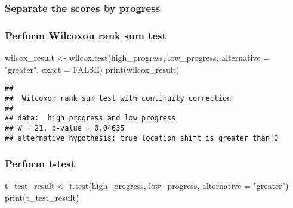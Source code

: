 \documentclass[
]{article}
\newenvironment{Shaded}{\begin{snugshade}}{\end{snugshade}}
\newcommand{\AttributeTok}[1]{\textcolor[rgb]{0.77,0.63,0.00}{#1}}
\newcommand{\ConstantTok}[1]{\textcolor[rgb]{0.00,0.00,0.00}{#1}}
\newcommand{\FunctionTok}[1]{\textcolor[rgb]{0.00,0.00,0.00}{#1}}
\newcommand{\NormalTok}[1]{#1}
\newcommand{\OtherTok}[1]{\textcolor[rgb]{0.56,0.35,0.01}{#1}}
\newcommand{\SpecialCharTok}[1]{\textcolor[rgb]{0.00,0.00,0.00}{#1}}
\newcommand{\StringTok}[1]{\textcolor[rgb]{0.31,0.60,0.02}{#1}}
\begin{document}
\hypertarget{separate-the-scores-by-progress}{%
\subsubsection{Separate the scores by
progress}\label{separate-the-scores-by-progress}}

\begin{Shaded}
\end{Shaded}

\hypertarget{perform-wilcoxon-rank-sum-test}{%
\subsubsection{Perform Wilcoxon rank sum
test}\label{perform-wilcoxon-rank-sum-test}}

\begin{Shaded}
\begin{Highlighting}[]
\NormalTok{wilcox\_result }\OtherTok{\textless{}{-}} \FunctionTok{wilcox.test}\NormalTok{(high\_progress, low\_progress, }\AttributeTok{alternative =} \StringTok{"greater"}\NormalTok{, }\AttributeTok{exact =} \ConstantTok{FALSE}\NormalTok{)}
\FunctionTok{print}\NormalTok{(wilcox\_result)}
\end{Highlighting}
\end{Shaded}

\begin{verbatim}
## 
##  Wilcoxon rank sum test with continuity correction
## 
## data:  high_progress and low_progress
## W = 21, p-value = 0.04635
## alternative hypothesis: true location shift is greater than 0
\end{verbatim}

\hypertarget{perform-t-test}{%
\subsubsection{Perform t-test}\label{perform-t-test}}

\begin{Shaded}
\begin{Highlighting}[]
\NormalTok{t\_test\_result }\OtherTok{\textless{}{-}} \FunctionTok{t.test}\NormalTok{(high\_progress, low\_progress, }\AttributeTok{alternative =} \StringTok{"greater"}\NormalTok{)}
\FunctionTok{print}\NormalTok{(t\_test\_result)}
\end{Highlighting}
\end{Shaded}
\end{document}

